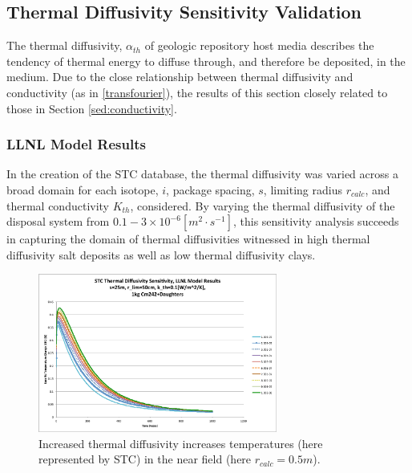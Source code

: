 \subsection{Thermal Diffusivity Sensitivity Validation}\label{sec:diffusivity}
The thermal diffusivity, $\alpha_{th}$ of geologic repository host media 
describes the tendency of thermal energy to diffuse through, and therefore be 
deposited, in the medium. Due to the close relationship between thermal 
diffusivity and conductivity (as in \eqref{transfourier}), the results of this section 
closely related to those in Section \ref{sed:conductivity}.

\FloatBarrier
\subsubsection{LLNL Model Results}

In the creation of the \gls{STC} database, the thermal diffusivity was varied 
across a broad domain for each isotope, $i$, package spacing, $s$, limiting 
radius $r_{calc}$, and thermal conductivity $K_{th}$, considered.  By 
varying the thermal diffusivity of the disposal system from $0.1-3\times 
10^{-6} [m^2\cdot s^{-1}]$, this sensitivity analysis succeeds in capturing the domain of 
thermal diffusivities witnessed in high thermal diffusivity salt deposits as 
well as low thermal diffusivity clays.

\begin{figure}[htbp!]
\begin{center}
\includegraphics[width=0.7\textwidth]{./chapters/demonstration/diffusivity/Cm242alpha_kth_low.eps}
\end{center}
\caption[$K_{th}$ Sensitivity to $\alpha_{th}$ for low $k_{th}$]{Increased thermal 
diffusivity increases temperatures (here represented by \gls{STC}) in the near field (here $r_{calc} = 0.5m$).}
\label{fig:Cm242alpha_kth_low}
\end{figure}


